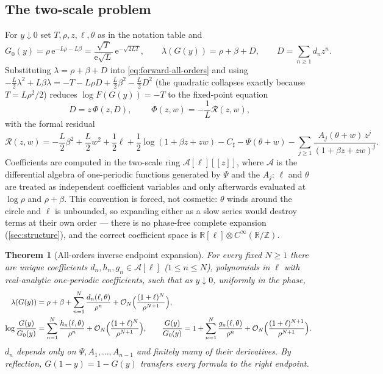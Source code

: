 \documentclass[11pt,oneside]{article}
\numberwithin{equation}{section}
\newtheorem{theorem}{Theorem}[section]
\theoremstyle{definition}
\theoremstyle{remark}
\newcommand{\R}{\mathbb R}
\newcommand{\Z}{\mathbb Z}
\newcommand{\e}{\mathrm e}
\newcommand{\bigO}{\mathcal O}
\newcommand{\Csharp}{C_{\sharp}}
\newcommand{\Gzero}{G_0}
\begin{document}
\subsection{The two-scale problem}

For $y\downarrow0$ set
$T,\rho,z,\ell,\theta$ as in the notation table and
\begin{equation}
 \Gzero(y)=\rho\,\e^{-L\rho-L\beta}
 =\frac{\sqrt T}{\e\sqrt L}\,\e^{-\sqrt{2LT}},
 \qquad
 \lambda(G(y))=\rho+\beta+D,
 \qquad
 D=\sum_{n\ge1}d_nz^{n}.
 \label{eq:G0-D}
\end{equation}
Substituting $\lambda=\rho+\beta+D$ into
\eqref{eq:forward-all-orders} and using
$-\tfrac L2\lambda^{2}+L\beta\lambda
=-T-L\rho D+\tfrac L2\beta^{2}-\tfrac L2D^{2}$ (the quadratic
collapses exactly because $T=L\rho^{2}/2$) reduces
$\log F(G(y))=-T$ to the fixed-point equation
\begin{equation}
 \boxed{\;D=z\,\Phi(z,D),\;}
 \qquad
 \Phi(z,w)=-\frac1L\mathcal R(z,w),
 \label{eq:fixed-point}
\end{equation}
with the formal residual
\begin{equation}
 \mathcal R(z,w)=
 -\frac L2\beta^{2}+\frac L2w^{2}+\frac12\ell
 +\frac12\log(1+\beta z+zw)
 -\Csharp-\Psi(\theta+w)
 -\sum_{j\ge1}\frac{A_j(\theta+w)\,z^{j}}{(1+\beta z+zw)^{j}}.
 \label{eq:R-def}
\end{equation}
Coefficients are computed in the two-scale ring
$\mathscr A[\ell][[z]]$, where $\mathscr A$ is the differential
algebra of one-periodic functions generated by $\Psi$ and the $A_j$:
$\ell$ and $\theta$ are treated as independent coefficient variables
and only afterwards evaluated at $\log\rho$ and $\rho+\beta$.  This
convention is forced, not cosmetic: $\theta$ winds around the circle
and $\ell$ is unbounded, so expanding either as a slow series would
destroy terms at their own order --- there is no phase-free complete
expansion (\cref{sec:structure}), and the correct coefficient space
is $\R[\ell]\otimes C^\infty(\R/\Z)$.

\begin{theorem}[All-orders inverse endpoint expansion]
\label{thm:all-orders}
For every fixed $N\ge1$ there are unique coefficients
$d_n,h_n,g_n\in\mathscr A[\ell]$ ($1\le n\le N$), polynomials in
$\ell$ with real-analytic one-periodic coefficients, such that as
$y\downarrow0$, uniformly in the phase,
\begin{align}
 \lambda(G(y))
 &=\rho+\beta+\sum_{n=1}^{N}\frac{d_n(\ell,\theta)}{\rho^{n}}
 +\bigO_N\Bigl(\frac{(1+\ell)^{N}}{\rho^{N+1}}\Bigr),
 \label{eq:phase-expansion}\\
 \log\frac{G(y)}{\Gzero(y)}
 &=\sum_{n=1}^{N}\frac{h_n(\ell,\theta)}{\rho^{n}}
 +\bigO_N\Bigl(\frac{(1+\ell)^{N}}{\rho^{N+1}}\Bigr),
 \qquad
 \frac{G(y)}{\Gzero(y)}
 =1+\sum_{n=1}^{N}\frac{g_n(\ell,\theta)}{\rho^{n}}
 +\bigO_N\Bigl(\frac{(1+\ell)^{N+1}}{\rho^{N+1}}\Bigr).
 \label{eq:G-expansion}
\end{align}
$d_n$ depends only on $\Psi,A_1,\dots,A_{n-1}$ and finitely many of
their derivatives.  By reflection, $G(1-y)=1-G(y)$ transfers every
formula to the right endpoint.
\end{theorem}
\end{document}
